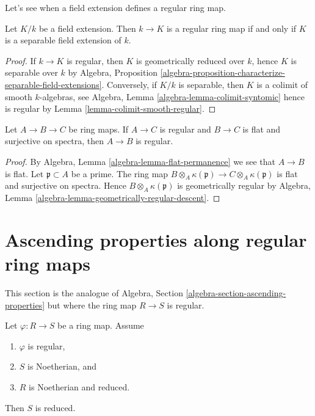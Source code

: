\noindent
Let's see when a field extension defines a regular ring map.

\begin{lemma}
\label{lemma-regular-field-extension}
Let $K/k$ be a field extension. Then $k \to K$ is a regular
ring map if and only if $K$ is a separable field extension of $k$.
\end{lemma}

\begin{proof}
If $k \to K$ is regular, then $K$ is geometrically reduced over $k$,
hence $K$ is separable over $k$ by
Algebra, Proposition
\ref{algebra-proposition-characterize-separable-field-extensions}.
Conversely, if $K/k$ is separable, then $K$ is a colimit of smooth
$k$-algebras, see
Algebra, Lemma \ref{algebra-lemma-colimit-syntomic}
hence is regular by
Lemma \ref{lemma-colimit-smooth-regular}.
\end{proof}

\begin{lemma}
\label{lemma-regular-permanence}
Let $A \to B \to C$ be ring maps. If $A \to C$ is regular and $B \to C$
is flat and surjective on spectra, then $A \to B$ is regular.
\end{lemma}

\begin{proof}
By Algebra, Lemma \ref{algebra-lemma-flat-permanence} we see that
$A \to B$ is flat. Let $\mathfrak p \subset A$ be a prime. The ring
map $B \otimes_A \kappa(\mathfrak p) \to C \otimes_A \kappa(\mathfrak p)$
is flat and surjective on spectra. Hence $B \otimes_A \kappa(\mathfrak p)$
is geometrically regular by
Algebra, Lemma \ref{algebra-lemma-geometrically-regular-descent}.
\end{proof}




\section{Ascending properties along regular ring maps}
\label{section-ascending-properties}

\noindent
This section is the analogue of
Algebra, Section \ref{algebra-section-ascending-properties}
but where the ring map $R \to S$ is regular.

\begin{lemma}
\label{lemma-reduced-goes-up}
Let $\varphi : R \to S$ be a ring map. Assume
\begin{enumerate}
\item $\varphi$ is regular,
\item $S$ is Noetherian, and
\item $R$ is Noetherian and reduced.
\end{enumerate}
Then $S$ is reduced.
\end{lemma}

